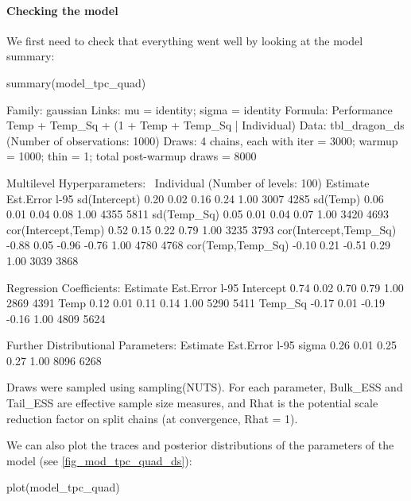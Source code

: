 \documentclass[a4paper,12pt,twoside]{article}
\begin{document}
\paragraph{Checking the model}
We first need to check that everything went well by looking at the model summary:
\begin{Rinput}
summary(model_tpc_quad)
\end{Rinput}
\begin{Routput}
 Family: gaussian 
  Links: mu = identity; sigma = identity 
Formula: Performance ~ Temp + Temp_Sq + (1 + Temp + Temp_Sq | Individual) 
   Data: tbl_dragon_ds (Number of observations: 1000) 
  Draws: 4 chains, each with iter = 3000; warmup = 1000; thin = 1;
         total post-warmup draws = 8000

Multilevel Hyperparameters:
~Individual (Number of levels: 100) 
                       Estimate Est.Error l-95%
sd(Intercept)              0.20      0.02     0.16     0.24 1.00     3007     4285
sd(Temp)                   0.06      0.01     0.04     0.08 1.00     4355     5811
sd(Temp_Sq)                0.05      0.01     0.04     0.07 1.00     3420     4693
cor(Intercept,Temp)        0.52      0.15     0.22     0.79 1.00     3235     3793
cor(Intercept,Temp_Sq)    -0.88      0.05    -0.96    -0.76 1.00     4780     4768
cor(Temp,Temp_Sq)         -0.10      0.21    -0.51     0.29 1.00     3039     3868

Regression Coefficients:
          Estimate Est.Error l-95%
Intercept     0.74      0.02     0.70     0.79 1.00     2869     4391
Temp          0.12      0.01     0.11     0.14 1.00     5290     5411
Temp_Sq      -0.17      0.01    -0.19    -0.16 1.00     4809     5624

Further Distributional Parameters:
      Estimate Est.Error l-95%
sigma     0.26      0.01     0.25     0.27 1.00     8096     6268

Draws were sampled using sampling(NUTS). For each parameter, Bulk_ESS
and Tail_ESS are effective sample size measures, and Rhat is the potential
scale reduction factor on split chains (at convergence, Rhat = 1).
\end{Routput}
We can also plot the traces and posterior distributions of the parameters of the model (see \autoref{fig_mod_tpc_quad_ds}):
\begin{Rinput}
plot(model_tpc_quad)
\end{Rinput}
\end{document}
